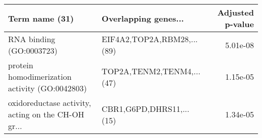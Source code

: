 \begin{tabular}{llr}
\toprule
                                    Term name (31) &       Overlapping genes... &  Adjusted p-value \\
\midrule
                          RNA binding (GO:0003723) & EIF4A2,TOP2A,RBM28,...(89) &          5.01e-08 \\
    protein homodimerization activity (GO:0042803) &  TOP2A,TENM2,TENM4,...(47) &          1.15e-05 \\
oxidoreductase activity, acting on the CH-OH gr... &   CBR1,G6PD,DHRS11,...(15) &          1.34e-05 \\
\bottomrule
\end{tabular}
